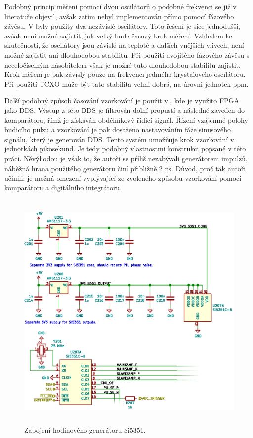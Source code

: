 Podobný princip měření pomocí dvou oscilátorů o podobné frekvenci se již v literatuře objevil, avšak zatím nebyl implementován přímo pomocí fázového závěsu. V \cite{vernierreflectometer} byly použity dva nezávislé oscilátory. Toto řešení je sice jednodušší, avšak není možné zajistit, jak velký bude časový krok měření. Vzhledem ke skutečnosti, že oscilátory jsou závislé na teplotě a dalších vnějších vlivech, není možné zajistit ani dlouhodobou stabilitu. Při použití dvojitého fázového závěsu s neceločíselným násobitelem však je možné tuto dlouhodobou stabilitu zajistit. Krok měření je pak závislý pouze na frekvenci jediného krystalového oscilátoru. Při použití \acrshort{TCXO} může být tato stabilita velmi dobrá, na úrovni jednotek \si{ppm}.

Další podobný způsob časování vzorkování je použit v \cite{ddsfpgareflectometer}, kde je využito \acrshort{FPGA} jako \acrshort{DDS}. Výstup z této \acrshort{DDS} je filtrován dolní propustí a následně zaveden do komparátoru, římž je získáván obdélníkový řídicí signál. Řízení vzájemné polohy budicího pulzu a vzorkování je pak dosaženo nastavováním fáze sinusového signálu, který je generován \acrshort{DDS}. Tento systém umožňuje krok vzorkování v jednotkách pikosekund. Je tedy podobný vlastnostmi konstrukci popsané v této práci. Něvýhodou je však to, že autoři se příliš nezabývali generátorem impulzů, náběžná hrana použitého generátoru činí přibližně 2 \si{ns}. Důvod, proč tak autoři učinili, je možná omezení vyplývající ze zvoleného způsobu vzorkování pomocí komparátoru a digitálního integrátoru.

\begin{figure}[htbp]
\includegraphics[width=\textwidth,height=12cm,keepaspectratio]{images/timing_section.eps}\caption{Zapojení hodinového generátoru Si5351.}\label{timing_section_schematic}
\end{figure}	

